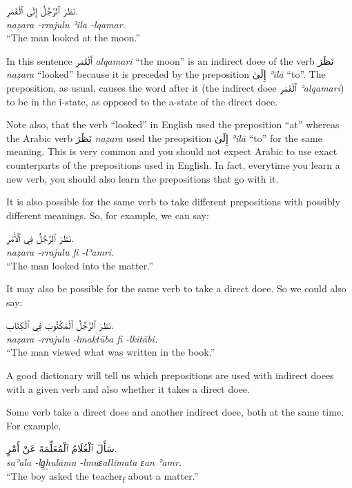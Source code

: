 \documentclass[
  10pt,
]{book}
\begin{document}
\foreignlanguage{arabic}{نَظَرَ ٱلرَّجُلُ إِلَى ٱلْقَمَرِ.}\\
\emph{naẓara -rrajulu ʾila -lqamar.}\\
\enquote{The man looked at the moon.}

In this sentence \foreignlanguage{arabic}{ٱَلْقَمَرِ} \emph{alqamari} \enquote{the moon} is an indirect doee of the verb \foreignlanguage{arabic}{نَظَرَ} \emph{naẓara} \enquote{looked} because it is preceded by the preposition \foreignlanguage{arabic}{إِلَىٰ} \emph{ʾilā} \enquote{to}. The preposition, as usual, causes the word after it (the indirect doee \foreignlanguage{arabic}{ٱَلْقَمَرِ} \emph{ʾalqamari}) to be in the i-state, as opposed to the a-state of the direct doee.

Note also, that the verb \enquote{looked} in English used the preposition \enquote{at} whereas the Arabic verb \foreignlanguage{arabic}{نَظَرَ} \emph{naẓara} used the preopsition \foreignlanguage{arabic}{إِلَىٰ} \emph{ʾilā} \enquote{to} for the same meaning. This is very common and you should not expect Arabic to use exact counterparts of the prepositions used in English. In fact, everytime you learn a new verb, you should also learn the prepositions that go with it.

It is also possible for the same verb to take different prepositions with possibly different meanings. So, for example, we can say:

\foreignlanguage{arabic}{نَظَرَ ٱلرَّجُلُ فِي ٱلْأَمْرِ.}\\
\emph{naẓara -rrajulu fi -lʾamri.}\\
\enquote{The man looked into the matter.}

It may also be possible for the same verb to take a direct doee. So we could also say:

\foreignlanguage{arabic}{نَظَرَ ٱلرَّجُلُ ٱلْمَکْتُوبَ فِي ٱلْکِتَابِ.}\\
\emph{naẓara -rrajulu -lmaktūba fi -lkitābi.}\\
\enquote{The man viewed what was written in the book.}

A good dictionary will tell us which prepositions are used with indirect doees with a given verb and also whether it takes a direct doee.

Some verb take a direct doee and another indirect doee, both at the same time. For example,

\foreignlanguage{arabic}{سَأَلَ ٱلْغُلَامُ ٱلْمُعَلِّمَةَ عَنْ أَمْرٍ.}\\
\emph{saʾala -lg͟hulāmu -lmuɛallimata ɛan ʾamr.}\\
\enquote{The boy asked the teacher\textsubscript{f} about a matter.}
\end{document}
